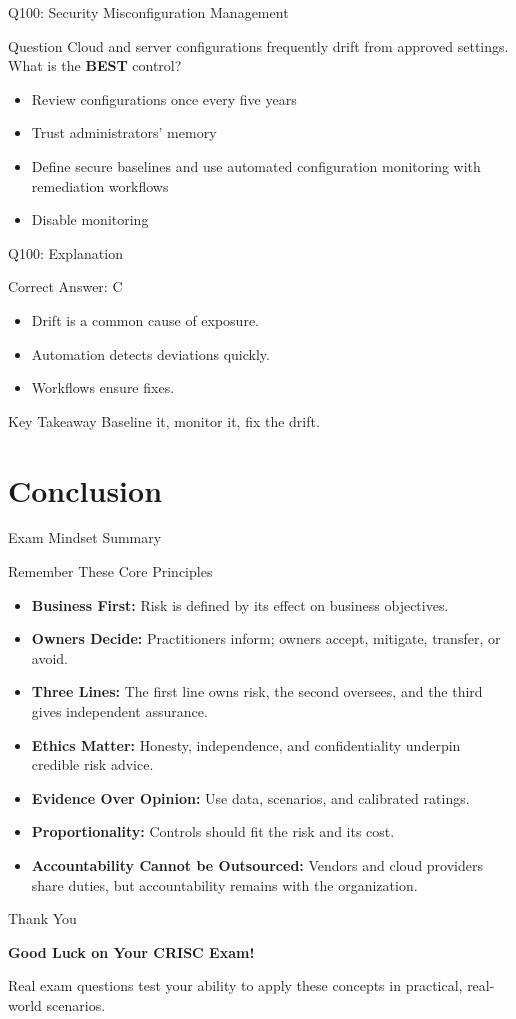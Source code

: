 \documentclass[aspectratio=169]{beamer}
\newcommand{\hq}[7]{%
	\begin{frame}{Q#1: #2}
		\begin{block}{Question}
			#3
		\end{block}
		\begin{itemize}
			#4
		\end{itemize}
	\end{frame}
	\begin{frame}{Q#1: Explanation}
		\begin{block}{Correct Answer: #5}
			\begin{itemize}
				#6
			\end{itemize}
		\end{block}
		\begin{alertblock}{Key Takeaway}
			#7
		\end{alertblock}
	\end{frame}
}
\begin{document}
	\hq{100}{Security Misconfiguration Management}
	{Cloud and server configurations frequently drift from approved settings. What is the \textbf{BEST} control?}
	{\item[\textbf{(A)}] Review configurations once every five years
		\item[\textbf{(B)}] Trust administrators' memory
		\item[\textbf{(C)}] Define secure baselines and use automated configuration monitoring with remediation workflows
		\item[\textbf{(D)}] Disable monitoring}
	{C}
	{\item Drift is a common cause of exposure.
		\item Automation detects deviations quickly.
		\item Workflows ensure fixes.}
	{Baseline it, monitor it, fix the drift.}
	
	\section{Conclusion}
	
	\begin{frame}{Exam Mindset Summary}
		\begin{block}{Remember These Core Principles}
			\begin{itemize}
				\item \textbf{Business First:} Risk is defined by its effect on business objectives.
				\item \textbf{Owners Decide:} Practitioners inform; owners accept, mitigate, transfer, or avoid.
				\item \textbf{Three Lines:} The first line owns risk, the second oversees, and the third gives independent assurance.
				\item \textbf{Ethics Matter:} Honesty, independence, and confidentiality underpin credible risk advice.
				\item \textbf{Evidence Over Opinion:} Use data, scenarios, and calibrated ratings.
				\item \textbf{Proportionality:} Controls should fit the risk and its cost.
				\item \textbf{Accountability Cannot be Outsourced:} Vendors and cloud providers share duties, but accountability remains with the organization.
			\end{itemize}
		\end{block}
	\end{frame}
	
	\begin{frame}{Thank You}
		\begin{center}
			{\Huge \textbf{Good Luck on Your CRISC Exam!}}
			
			\vspace{1cm}
			
			\normalsize
			Real exam questions test your ability to apply these concepts in practical, real-world scenarios.
		\end{center}
	\end{frame}
	
\end{document}
